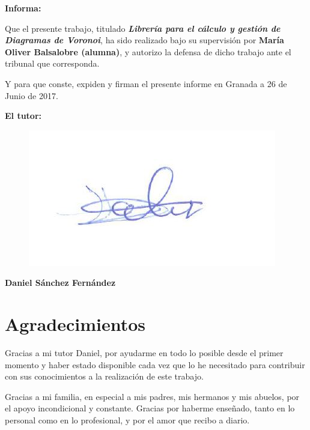 \textbf{Informa:}

\vspace{0.5cm}

Que el presente trabajo, titulado \textit{\textbf{Librería para el cálculo y gestión de Diagramas de Voronoi}}, ha sido realizado bajo su supervisión por \textbf{María Oliver Balsalobre (alumna)}, y autorizo la defensa de dicho trabajo ante el tribunal que corresponda.

\vspace{0.5cm}

Y para que conste, expiden y firman el presente informe en Granada a 26 de Junio de 2017.

\vspace{1cm}

\textbf{El tutor:}

\begin{figure}  [H]
    \centering
    \includegraphics[scale=0.7]{imagenes/firmaDani.JPG}
\end{figure}

\vspace{3cm}

\noindent \textbf{Daniel Sánchez Fernández}

\chapter*{Agradecimientos}
\thispagestyle{empty}

Gracias a mi tutor Daniel, por ayudarme en todo lo posible desde el primer momento y haber estado disponible cada vez que lo he necesitado para contribuir con sus conocimientos a la realización de este trabajo.
\vspace{0.5cm}

Gracias a mi familia, en especial a mis padres, mis hermanos y mis abuelos, por el apoyo incondicional y constante. Gracias por haberme enseñado, tanto en lo personal como en lo profesional, y por el amor que recibo a diario.
\vspace{0.3cm}

